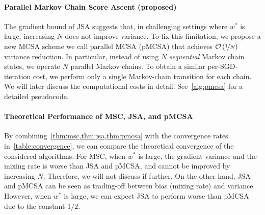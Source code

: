 \paragraph{Parallel Markov Chain Score Ascent (proposed)}
The gradient bound of JSA suggests that, in challenging settings where \(w^*\) is large, increasing \(N\) does not improve variance.
To fix this limitation, we propose a new MCSA scheme we call parallel MCSA (pMCSA) that achieves \(\mathcal{O}\left(\nicefrac{1}{N}\right)\) variance reduction.
In particular, instead of using \(N\) \textit{sequential} Markov chain states, we operate \(N\) parallel Markov chains.
To obtain a similar per-SGD-iteration cost, we perform only a single Markov-chain transition for each chain.
We will later discuss the computational costs in detail.
See~\cref{alg:pmcsa} for a detailed pseudocode.




\vspace{-0.05in}
\paragraph{Theoretical Performance of MSC, JSA, and pMCSA}
By combining~\cref{thm:msc,thm:jsa,thm:pmcsa} with the convergence rates in~\cref{table:convergence}, we can compare the theoretical convergence of the considered algorithms.
For MSC, when \(w^*\) is large, the gradient variance and the mixing rate is worse than JSA and pMCSA, and cannot be improved by increasing \(N\).
Therefore, we will not discuss if further.
On the other hand, JSA and pMCSA can be seen as trading-off between bias (mixing rate) and variance.
However, when \(w^*\) is large, we can expect JSA to perform worse than pMCSA due to the constant \(1/2\).

\vspace{-0.05in}
